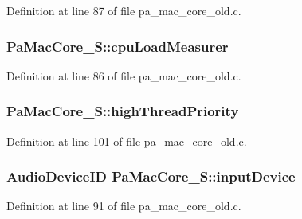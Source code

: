 Definition at line 87 of file pa\+\_\+mac\+\_\+core\+\_\+old.\+c.

\subsubsection[{\texorpdfstring{cpu\+Load\+Measurer}{cpuLoadMeasurer}}]{ Pa\+Mac\+Core\+\_\+\+S\+::cpu\+Load\+Measurer}\hypertarget{struct_pa_mac_core___s_a0f15c27d230448920776aed9d9a76ecd}{}\label{struct_pa_mac_core___s_a0f15c27d230448920776aed9d9a76ecd}


Definition at line 86 of file pa\+\_\+mac\+\_\+core\+\_\+old.\+c.

\subsubsection[{\texorpdfstring{high\+Thread\+Priority}{highThreadPriority}}]{ Pa\+Mac\+Core\+\_\+\+S\+::high\+Thread\+Priority}\hypertarget{struct_pa_mac_core___s_a50a18397874297facf9fe069ebec4091}{}\label{struct_pa_mac_core___s_a50a18397874297facf9fe069ebec4091}


Definition at line 101 of file pa\+\_\+mac\+\_\+core\+\_\+old.\+c.

\subsubsection[{\texorpdfstring{input\+Device}{inputDevice}}]{\setlength{\rightskip}{0pt plus 5cm}Audio\+Device\+ID Pa\+Mac\+Core\+\_\+\+S\+::input\+Device}\hypertarget{struct_pa_mac_core___s_abeb17a8d7442098c881ebc85d6b20df9}{}\label{struct_pa_mac_core___s_abeb17a8d7442098c881ebc85d6b20df9}


Definition at line 91 of file pa\+\_\+mac\+\_\+core\+\_\+old.\+c.

